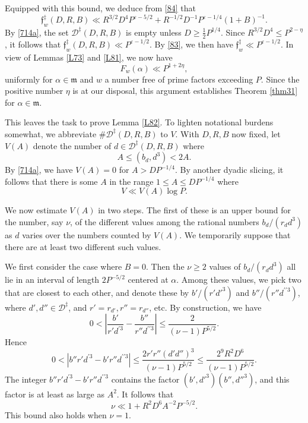 \documentclass[reqno]{amsart}
\newcommand\eps{\varepsilon}
\numberwithin{equation}{section}
\begin{document}
Equipped with this bound, we deduce from \eqref{84} that
$$\mathfrak f_w^\ddagger(D,R,B) \ll R^{3/2}D^4 P^{\eps - 5/2} + R^{-1/2} D^{-1} P^{\eps - 1/4} (1 + B)^{-1}.$$
By \eqref{714a}, the set $\mathscr{D}^\ddagger(D,R,B)$ is empty unless $D\geq \frac{1}{2} P^{1/4}$. Since $R^{3/2} D^4 \leq P^{2 - \eta}$, it follows that $\mathfrak f_w^\ddagger(D,R,B) \ll P^{\eps - 1/2}$. By \eqref{83}, we then have $\mathfrak f_w^\ddagger \ll P^{\eps - 1/2}$. In view of Lemmas \ref{L73} and \ref{L81}, we now have
$$
F_w(\alpha) \ll P^{1 + 2\eta},
$$
uniformly for $\alpha \in \mathfrak m$ and $w$ a number free of prime factors exceeding $P$. Since the positive number $\eta$ is at our disposal, this argument establishes Theorem \ref{thm31} for $\alpha \in \mathfrak m$.

This leaves the task to prove Lemma \ref{L82}. To lighten notational burdens somewhat, we abbreviate $\# \mathscr{D}^\ddagger(D,R,B)$ to $V$. With $D, R, B$ now fixed, let $V(A)$ denote the number of $d \in \mathscr{D}^\ddagger(D,R,B)$ where
\begin{equation}\label{86}A \leq (b_d,d^3) < 2A.\end{equation}
By \eqref{714a}, we have $V(A) = 0$ for $A > DP^{-1/4}$. By another dyadic slicing, it follows that there is some $A$ in the range $1 \leq A \leq DP^{-1/4}$ where
\begin{equation}\label{87}V \ll V(A) \log P.\end{equation}

We now estimate $V(A)$ in two steps. The first of these is an upper bound for the number, say $\nu$, of the different values among the rational numbers $b_d/(r_d d^3)$ as $d$ varies over the numbers counted by $V(A)$. We temporarily suppose that there are at least two different such values.

We first consider the case where $B = 0$. Then the $\nu \geq 2$ values of $b_d/(r_d d^3)$ all lie in an interval of length $2P^{-5/2}$ centered at $\alpha$. Among these values, we pick two that are closest to each other, and denote these by $b'/(r'd'^3)$ and $b''/(r'' d^{\prime\prime 3})$, where $d', d'' \in \mathscr{D}^\ddagger$, and $r' = r_{d'}, r'' = r_{d''}$, etc. By construction, we have
$$
0 < \left|\frac{b'}{r' d^{\prime 3}} - \frac{b''}{r'' d^{\prime\prime 3}}\right| \leq \frac{2}{(\nu - 1)P^{5/2}}.
$$
Hence
$$
0 < \left| {b'' r' d^{\prime 3} - b' r'' d^{\prime\prime 3}}\right| \leq \frac{2r' r'' (d'd'')^3}{(\nu - 1) P^{5/2}} \leq \frac{2^{9} R^2 D^6}{(\nu - 1) P^{5/2}}.
$$
The integer $b'' r' d^{\prime 3} - b' r'' d^{\prime\prime 3}$ contains the factor $(b',d'^3)(b'',d''^3)$, and this factor is at least as large as $A^2$. It follows that
$$
\nu \ll 1 + R^2 D^6 A^{-2} P^{-5/2}.
$$
This bound also holds when $\nu = 1$.
\end{document}
